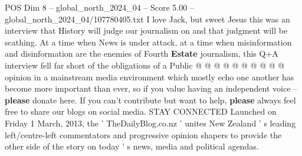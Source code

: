 \begin{textsample}{POS Dim 8 – global\_north\_2024\_04 – Score 5.00 – global\_north\_2024\_04/107780405.txt}
I love Jack, but sweet Jesus this was an interview that History will judge our journalism on and that judgment will be scathing.
At a time when News is under attack, at a time when misinformation and disinformation are the enemies of Fourth \textbf{Estate} journalism, this Q+A interview fell far short of the obligations of a Public @ @ @ @ @ @ @ @ @ @ opinion in a mainstream media environment which mostly echo one another has become more important than ever, so if you value having an independent voice -- \textbf{please} donate here.
If you can't contribute but want to help, \textbf{please} always feel free to share our blogs on social media.
STAY CONNECTED Launched on Friday 1 March, 2013, the ' TheDailyBlog.co.nz ' unites New Zealand ' s leading left/centre-left commentators and progressive opinion shapers to provide the other side of the story on today ' s news, media and political agendas.

\end{textsample}
